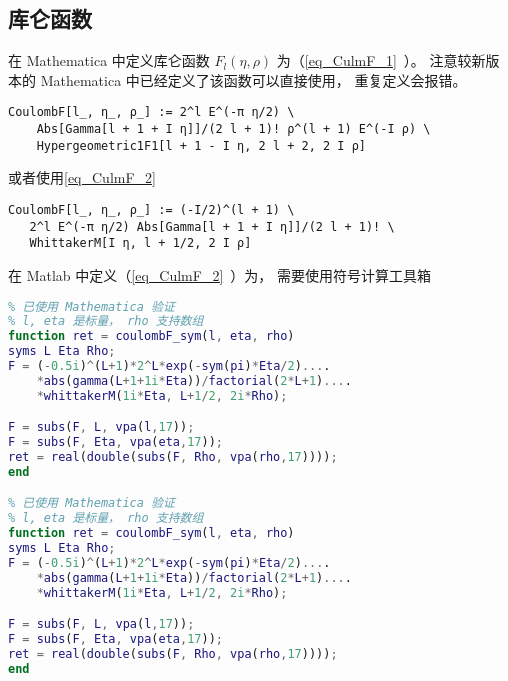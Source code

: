 


\subsection{库仑函数}
在 Mathematica 中定义库仑函数 $F_l(\eta, \rho)$ 为（\autoref{eq_CulmF_1}~）。 注意较新版本的 Mathematica 中已经定义了该函数可以直接使用， 重复定义会报错。
\begin{lstlisting}[language=mma] % 已验证
CoulombF[l_, η_, ρ_] := 2^l E^(-π η/2) \
    Abs[Gamma[l + 1 + I η]]/(2 l + 1)! ρ^(l + 1) E^(-I ρ) \
    Hypergeometric1F1[l + 1 - I η, 2 l + 2, 2 I ρ]
\end{lstlisting}
或者使用\autoref{eq_CulmF_2}~\upref{CulmF} %
\begin{lstlisting}[language=mma]
CoulombF[l_, η_, ρ_] := (-I/2)^(l + 1) \
   2^l E^(-π η/2) Abs[Gamma[l + 1 + I η]]/(2 l + 1)! \
   WhittakerM[I η, l + 1/2, 2 I ρ]
\end{lstlisting}

在 Matlab 中定义（\autoref{eq_CulmF_2}~\upref{CulmF}）为， 需要使用符号计算工具箱 %
\begin{lstlisting}[language=matlab, caption=coulombF\_sym.m]
% 第一类库仑函数 F_l(eta, rho)
% 已使用 Mathematica 验证
% l, eta 是标量， rho 支持数组
function ret = coulombF_sym(l, eta, rho)
syms L Eta Rho;
F = (-0.5i)^(L+1)*2^L*exp(-sym(pi)*Eta/2)....
    *abs(gamma(L+1+1i*Eta))/factorial(2*L+1)....
    *whittakerM(1i*Eta, L+1/2, 2i*Rho);

F = subs(F, L, vpa(l,17));
F = subs(F, Eta, vpa(eta,17));
ret = real(double(subs(F, Rho, vpa(rho,17))));
end

% 已使用 Mathematica 验证
% l, eta 是标量， rho 支持数组
function ret = coulombF_sym(l, eta, rho)
syms L Eta Rho;
F = (-0.5i)^(L+1)*2^L*exp(-sym(pi)*Eta/2)....
    *abs(gamma(L+1+1i*Eta))/factorial(2*L+1)....
    *whittakerM(1i*Eta, L+1/2, 2i*Rho);

F = subs(F, L, vpa(l,17));
F = subs(F, Eta, vpa(eta,17));
ret = real(double(subs(F, Rho, vpa(rho,17))));
end

\end{lstlisting}

